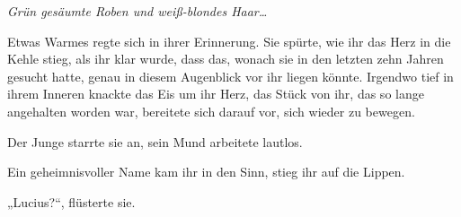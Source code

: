 \emph{Grün gesäumte Roben und weiß-blondes Haar…}

Etwas Warmes regte sich in ihrer Erinnerung. Sie spürte, wie ihr das Herz in die Kehle stieg, als ihr klar wurde, dass das, wonach sie in den letzten zehn Jahren gesucht hatte, genau in diesem Augenblick vor ihr liegen könnte. Irgendwo tief in ihrem Inneren knackte das Eis um ihr Herz, das Stück von ihr, das so lange angehalten worden war, bereitete sich darauf vor, sich wieder zu bewegen.

Der Junge starrte sie an, sein Mund arbeitete lautlos.

Ein geheimnisvoller Name kam ihr in den Sinn, stieg ihr auf die Lippen.

„Lucius?“, flüsterte sie.

